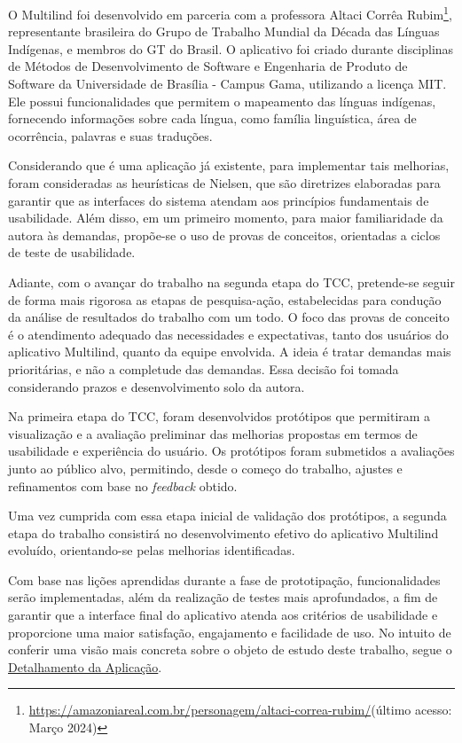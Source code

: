 O Multilind foi desenvolvido em parceria com a professora Altaci Corrêa Rubim\footnote{\url{https://amazoniareal.com.br/personagem/altaci-correa-rubim/}(último acesso: Março 2024)}, representante brasileira do Grupo de Trabalho Mundial da Década das Línguas Indígenas, 
e membros do GT do Brasil. O aplicativo foi criado durante disciplinas de Métodos de Desenvolvimento de Software e Engenharia de Produto de Software da Universidade de Brasília - Campus Gama, utilizando a licença MIT. Ele possui funcionalidades que permitem o mapeamento 
das línguas indígenas, fornecendo informações sobre cada língua, como família linguística, área de ocorrência, palavras e suas traduções.

Considerando que é uma aplicação já existente, para implementar tais melhorias, foram consideradas as heurísticas de Nielsen, que são diretrizes elaboradas para garantir que as interfaces do sistema atendam aos princípios fundamentais de usabilidade. Além disso, em um 
primeiro momento, para maior familiaridade da autora às demandas, propõe-se o uso de provas de conceitos, orientadas a ciclos de teste de usabilidade. 

Adiante, com o avançar do trabalho na segunda etapa do TCC, pretende-se seguir de forma mais rigorosa as etapas de 
pesquisa-ação, estabelecidas para condução da análise de resultados do trabalho com um todo. O foco das provas de conceito é o atendimento adequado das necessidades e expectativas, tanto dos usuários do aplicativo Multilind, quanto da equipe envolvida. A ideia é tratar 
demandas mais prioritárias, e não a completude das demandas. Essa decisão foi tomada considerando prazos e desenvolvimento solo da autora.

Na primeira etapa do TCC, foram desenvolvidos protótipos que permitiram a visualização e a avaliação preliminar das melhorias propostas em termos de usabilidade e experiência do usuário. Os protótipos 
foram submetidos a avaliações junto ao público alvo, permitindo, desde o começo do trabalho, ajustes e refinamentos com base no \textit{feedback} obtido. 

Uma vez cumprida com essa etapa inicial de validação dos protótipos, a segunda etapa do trabalho consistirá no desenvolvimento efetivo do aplicativo Multilind evoluído, orientando-se pelas melhorias identificadas. 

Com base nas lições aprendidas durante a fase de prototipação, funcionalidades serão implementadas, além da realização de testes mais aprofundados, a fim de garantir que a interface final do aplicativo atenda aos critérios de usabilidade e proporcione uma maior satisfação, engajamento e facilidade de uso. No intuito de conferir uma visão 
mais concreta sobre o objeto de estudo deste trabalho, segue o \hyperref[sec:Detalhamento da Aplicacao]{Detalhamento da Aplicação}.
	
